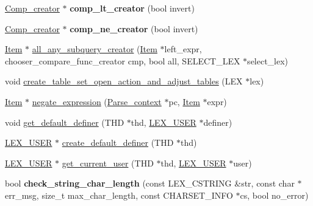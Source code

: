 \begin{DoxyCompactItemize}
\mbox{\label{group__Runtime__Environment_ga5581721018ae2b9b655cefa8bacfb255}} 
\mbox{\hyperlink{classComp__creator}{Comp\+\_\+creator}} $\ast$ {\bfseries comp\+\_\+lt\+\_\+creator} (bool invert)
\item 
\mbox{\label{group__Runtime__Environment_ga83bec074d98c59c94c8b0f8631df6e5b}} 
\mbox{\hyperlink{classComp__creator}{Comp\+\_\+creator}} $\ast$ {\bfseries comp\+\_\+ne\+\_\+creator} (bool invert)
\item 
\mbox{\hyperlink{classItem}{Item}} $\ast$ \mbox{\hyperlink{group__Runtime__Environment_gac994ea735fa021334a4e3c9370af1bd3}{all\+\_\+any\+\_\+subquery\+\_\+creator}} (\mbox{\hyperlink{classItem}{Item}} $\ast$left\+\_\+expr, chooser\+\_\+compare\+\_\+func\+\_\+creator cmp, bool all, S\+E\+L\+E\+C\+T\+\_\+\+L\+EX $\ast$select\+\_\+lex)
\item 
void \mbox{\hyperlink{group__Runtime__Environment_ga95cca4e86f6c748bc34a5879ae0d36f4}{create\+\_\+table\+\_\+set\+\_\+open\+\_\+action\+\_\+and\+\_\+adjust\+\_\+tables}} (L\+EX $\ast$lex)
\item 
\mbox{\hyperlink{classItem}{Item}} $\ast$ \mbox{\hyperlink{group__Runtime__Environment_ga370cd1baacb8f9761d1f6caba0f01954}{negate\+\_\+expression}} (\mbox{\hyperlink{structParse__context}{Parse\+\_\+context}} $\ast$pc, \mbox{\hyperlink{classItem}{Item}} $\ast$expr)
\item 
void \mbox{\hyperlink{group__Runtime__Environment_gae6109e9d93731678e792405018a30a24}{get\+\_\+default\+\_\+definer}} (T\+HD $\ast$thd, \mbox{\hyperlink{structst__lex__user}{L\+E\+X\+\_\+\+U\+S\+ER}} $\ast$definer)
\item 
\mbox{\hyperlink{structst__lex__user}{L\+E\+X\+\_\+\+U\+S\+ER}} $\ast$ \mbox{\hyperlink{group__Runtime__Environment_ga8ba3e531f8d364506ca098138bd4b459}{create\+\_\+default\+\_\+definer}} (T\+HD $\ast$thd)
\item 
\mbox{\hyperlink{structst__lex__user}{L\+E\+X\+\_\+\+U\+S\+ER}} $\ast$ \mbox{\hyperlink{group__Runtime__Environment_ga3317cfcf3ee5abca5accb1e77461ca56}{get\+\_\+current\+\_\+user}} (T\+HD $\ast$thd, \mbox{\hyperlink{structst__lex__user}{L\+E\+X\+\_\+\+U\+S\+ER}} $\ast$user)
\item 
\mbox{\label{group__Runtime__Environment_gaffd668a5d759810bb2234bdab39aa840}} 
bool {\bfseries check\+\_\+string\+\_\+char\+\_\+length} (const L\+E\+X\+\_\+\+C\+S\+T\+R\+I\+NG \&str, const char $\ast$err\+\_\+msg, size\+\_\+t max\+\_\+char\+\_\+length, const C\+H\+A\+R\+S\+E\+T\+\_\+\+I\+N\+FO $\ast$cs, bool no\+\_\+error)

\end{DoxyCompactItemize}

